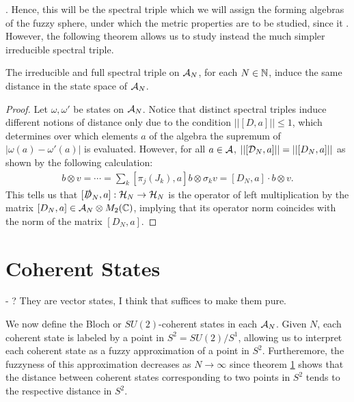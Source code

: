 . Hence, this will be the spectral triple which we will assign the forming algebras of the fuzzy sphere, under which the metric properties are to be studied, since it . However, the following theorem allows us to study instead the much simpler irreducible spectral triple.

\begin{theorem}
The irreducible and full spectral triple on $\mathcal A_N$, for each $N \in \mathbb{N}$, induce the same distance in the state space of $\mathcal A_N$.
\end{theorem}
\begin{proof}
Let $\omega, \omega'$ be states on $\mathcal A_N$. Notice that distinct spectral triples induce different notions of distance only due to the condition $||[D, a]|| \leq 1$, which determines over which elements $a$ of the algebra the supremum of $|\omega(a) - \omega'(a)|$ is evaluated. However, for all $a \in \mathcal A$, $||[\mathcal D_N, a]|| = ||[D_N, a]||$ as shown by the following calculation:
\begin{align*}
    [\dcal, a]b \otimes v = \cdots = \sum_k [\pi_j(J_k), a]b \otimes \sigma_k v = [D_N, a] \cdot b \otimes v.
\end{align*}
This tells us that $[\slashed D_N, a]: \mathcal H_N \to \mathcal H_N$ is the operator of left multiplication by the matrix $[D_N, a] \in \mathcal A_N \otimes M_2(\mathbb{C})$, implying that its operator norm coincides with the norm of the matrix $[D_N, a]$.
\end{proof}

\section{Coherent States}
 {\color{gray}

- ? They are vector states, I think that suffices to make them pure.
}

We now define the Bloch or $SU(2)$-coherent states in each $\mathcal A_N$. Given $N$, each coherent state is labeled by a point in $S^2 = SU(2) / S^1$, allowing us to interpret each coherent state as a fuzzy approximation of a point in $S^2$. Furtheremore, the fuzzyness of this approximation decreases as $N \to \infty$ since theorem \ref{} shows that the distance between coherent states corresponding to two points in $S^2$ tends to the respective distance in $S^2$. 

